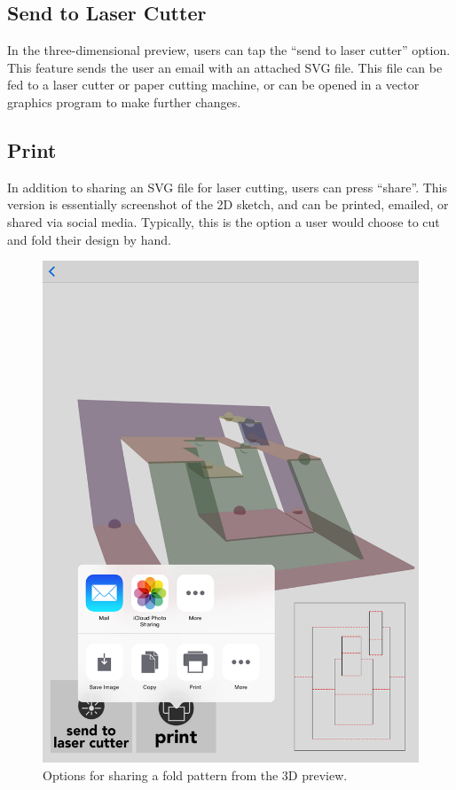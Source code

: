 \subsection{Send to Laser Cutter}\label{send-to-laser-cutter}

In the three-dimensional preview, users can tap the ``send to laser
cutter'' option. This feature sends the user an email with an attached
SVG file. This file can be fed to a laser cutter or paper cutting
machine, or can be opened in a vector graphics program to make further
changes.

\subsection{Print}\label{print}

In addition to sharing an SVG file for laser cutting, users can press
``share''. This version is essentially screenshot of the 2D sketch, and
can be printed, emailed, or shared via social media. Typically, this is
the option a user would choose to cut and fold their design by hand.

\begin{figure}[htbp]
\centering
\includegraphics{figures/32_UI_Tool_Interactions/3d-share.png}
\caption{Options for sharing a fold pattern from the 3D preview.}
\end{figure}
